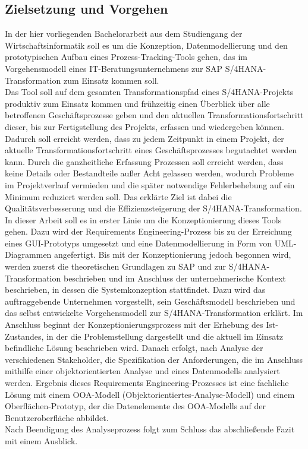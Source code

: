 \subsection{Zielsetzung und Vorgehen}
In der hier vorliegenden Bachelorarbeit aus dem Studiengang der Wirtschaftsinformatik soll es um die Konzeption, Datenmodellierung und den prototypischen Aufbau eines Prozess-Tracking-Tools gehen, das im Vorgehensmodell eines IT-Beratungsunternehmens zur SAP S/4HANA-Transformation zum Einsatz kommen soll.\\ Das Tool soll auf dem gesamten Transformationspfad eines S/4HANA-Projekts produktiv zum Einsatz kommen und frühzeitig einen Überblick über alle betroffenen Geschäftsprozesse geben und den aktuellen Transformationsfortschritt dieser, bis zur Fertigstellung des Projekts, erfassen und wiedergeben können. Dadurch soll erreicht werden, dass zu jedem Zeitpunkt in einem Projekt, der aktuelle Transformationsfortschritt eines Geschäftsprozesses begutachtet werden kann. Durch die ganzheitliche Erfassung Prozessen soll erreicht werden, dass keine Details oder Bestandteile außer Acht gelassen werden, wodurch Probleme im Projektverlauf vermieden und die später notwendige Fehlerbehebung auf ein Minimum reduziert werden soll. Das erklärte Ziel ist dabei die Qualitätsverbesserung und die Effizienzsteigerung der S/4HANA-Transformation.\\
In dieser Arbeit soll es in erster Linie um die Konzeptionierung dieses Tools gehen. Dazu wird der Requirements Engineering-Prozess bis zu der Erreichung eines GUI-Prototyps umgesetzt und eine Datenmodellierung in Form von UML-Diagrammen angefertigt. Bis mit der Konzeptionierung jedoch begonnen wird, werden zuerst die theoretischen Grundlagen zu SAP und zur S/4HANA-Transformation beschrieben und im Anschluss der unternehmerische Kontext beschrieben, in dessen die Systemkonzeption stattfindet. Dazu wird das auftraggebende Unternehmen vorgestellt, sein Geschäftsmodell beschrieben und das selbst entwickelte Vorgehensmodell zur S/4HANA-Transformation erklärt. Im Anschluss beginnt der Konzeptionierungsprozess mit der Erhebung des Ist-Zustandes, in der die Problemstellung dargestellt und die aktuell im Einsatz befindliche Lösung beschrieben wird. Danach erfolgt, nach Analyse der verschiedenen Stakeholder, die Spezifikation der Anforderungen, die im Anschluss mithilfe einer objektorientierten Analyse und eines Datenmodells analysiert werden. Ergebnis dieses Requirements Engineering-Prozesses ist eine fachliche Lösung mit einem OOA-Modell (Objektorientiertes-Analyse-Modell) und einem Oberflächen-Prototyp, der die Datenelemente des OOA-Modells auf der Benutzeroberfläche abbildet.\\Nach Beendigung des Analyseprozess folgt zum Schluss das abschließende Fazit mit einem Ausblick. 

